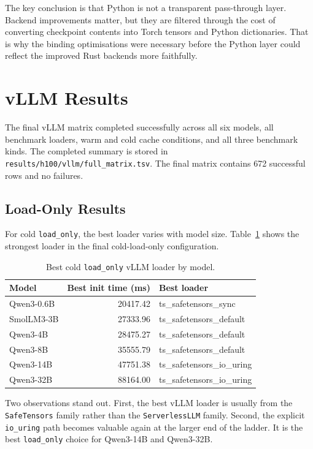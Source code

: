The key conclusion is that Python is not a transparent pass-through layer. Backend improvements matter, but they are filtered through the cost of converting checkpoint contents into Torch tensors and Python dictionaries. That is why the binding optimisations were necessary before the Python layer could reflect the improved Rust backends more faithfully.

\section{vLLM Results}

The final vLLM matrix completed successfully across all six models, all benchmark loaders, warm and cold cache conditions, and all three benchmark kinds. The completed summary is stored in \texttt{results/h100/vllm/full\_matrix.tsv}. The final matrix contains 672 successful rows and no failures.

\subsection{Load-Only Results}

For cold \texttt{load\_only}, the best loader varies with model size. Table~\ref{tab:vllm-load-only} shows the strongest loader in the final cold-load-only configuration.

\begin{table}[h]
\caption{Best cold \texttt{load\_only} vLLM loader by model.}
\label{tab:vllm-load-only}
\centering
\begin{tabular}{lrl}
\toprule
Model & Best init time (ms) & Best loader \\
\midrule
Qwen3-0.6B & 20417.42 & ts\_safetensors\_sync \\
SmolLM3-3B & 27333.96 & ts\_safetensors\_default \\
Qwen3-4B & 28475.27 & ts\_safetensors\_default \\
Qwen3-8B & 35555.79 & ts\_safetensors\_default \\
Qwen3-14B & 47751.38 & ts\_safetensors\_io\_uring \\
Qwen3-32B & 88164.00 & ts\_safetensors\_io\_uring \\
\bottomrule
\end{tabular}
\end{table}

Two observations stand out. First, the best vLLM loader is usually from the \texttt{SafeTensors} family rather than the \texttt{ServerlessLLM} family. Second, the explicit \texttt{io\_uring} path becomes valuable again at the larger end of the ladder. It is the best \texttt{load\_only} choice for Qwen3-14B and Qwen3-32B.

